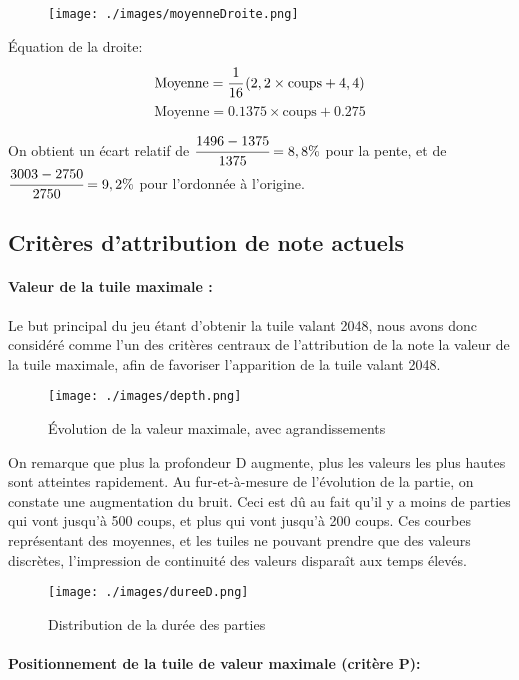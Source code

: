 \documentclass[a4paper]{report}
\begin{document}
\begin{wrapfigure}[16]{r}{9cm}
\texttt{[image: ./images/moyenneDroite.png]}
\end{wrapfigure}

Équation de la droite:
\[\text{Moyenne} = \cfrac{1}{16}\left(2,2\times \text{coups} + 4,4\right)\]
\[\text{Moyenne} = 0.1375\times \text{coups}+0.275\]

On obtient un écart relatif de $\cfrac{1496-1375}{1375} = 8,8\%$ pour la pente, et de $\cfrac{3003-2750}{2750} = 9,2\%$ pour l'ordonnée à l'origine.


\subsection{Critères d’attribution de note actuels}
\paragraph{Valeur de la tuile maximale :}
Le but principal du jeu étant d’obtenir la tuile valant 2048, nous avons donc considéré comme l’un des critères centraux de l’attribution de la note la valeur de la tuile maximale, afin de favoriser l’apparition de la tuile valant 2048.

\begin{figure}[h]
\begin{center}
\texttt{[image: ./images/depth.png]}
\end{center}
\caption{Évolution de la valeur maximale, avec agrandissements}
\end{figure}

On remarque que plus la profondeur D augmente, plus les valeurs les plus hautes sont atteintes rapidement. Au fur-et-à-mesure de l'évolution de la partie, on constate une augmentation du bruit. Ceci est dû au fait qu'il y a moins de parties qui vont jusqu'à 500 coups, et plus qui vont jusqu'à 200 coups. Ces courbes représentant des moyennes, et les tuiles ne pouvant prendre que des  valeurs discrètes, l'impression de continuité des valeurs disparaît aux temps élevés.

\begin{figure}[h]
\begin{center}
\texttt{[image: ./images/dureeD.png]}
\end{center}
\caption{Distribution de la durée des parties}
\end{figure}

\paragraph{Positionnement de la tuile de valeur maximale (critère P):}
\end{document}
